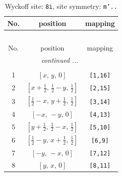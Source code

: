 \documentclass[fleqn,8pt]{jsarticle}
\begin{document}
\renewcommand{\arraystretch}{1.2}
\begin{longtable}{ccc}
\caption{Wyckoff site: {\tt 8i}, site symmetry: {\tt m'..}}
 \\
 \hline \hline
No. & position & mapping \\ \hline \endfirsthead

\multicolumn{2}{l}{\tablename\ \thetable{}} \\
 \hline \hline
No. & position & mapping \\ \hline \endhead

 \hline \hline
\multicolumn{2}{r}{\footnotesize\it continued ...} \\ \endfoot

 \hline \hline
\multicolumn{2}{r}{} \\ \endlastfoot

1 & $\left[ x,\, y,\, 0 \right]$ & {\tt [1,16]} \\ \hline
2 & $\left[ x + \frac{1}{2},\, \frac{1}{2} - y,\, \frac{1}{2} \right]$ & {\tt [2,15]} \\ \hline
3 & $\left[ \frac{1}{2} - x,\, y + \frac{1}{2},\, \frac{1}{2} \right]$ & {\tt [3,14]} \\ \hline
4 & $\left[ - x,\, - y,\, 0 \right]$ & {\tt [4,13]} \\ \hline
5 & $\left[ y + \frac{1}{2},\, \frac{1}{2} - x,\, \frac{1}{2} \right]$ & {\tt [5,10]} \\ \hline
6 & $\left[ \frac{1}{2} - y,\, x + \frac{1}{2},\, \frac{1}{2} \right]$ & {\tt [6,9]} \\ \hline
7 & $\left[ - y,\, - x,\, 0 \right]$ & {\tt [7,12]} \\ \hline
8 & $\left[ y,\, x,\, 0 \right]$ & {\tt [8,11]} \\
\end{longtable}
\renewcommand{\arraystretch}{1.2}
\end{document}
